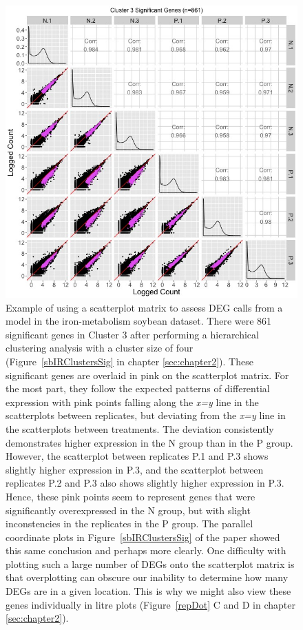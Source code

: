 \documentclass[11pt,a4paper,oldfontcommands,openany]{memoir}
\numberwithin{equation}{section} %
\begin{document}
\begin{figure}
\begin{framed}
\centerline{\includegraphics[width=\columnwidth]{MakeFigures/sbIRClusterSigSM3.jpg}}
\end{framed}
\caption{Example of using a scatterplot matrix to assess DEG calls from a model in the iron-metabolism soybean dataset. There were 861 significant genes in Cluster 3 after performing a hierarchical clustering analysis with a cluster size of four (Figure~\ref{sbIRClustersSig} in chapter \ref{sec:chapter2}). These significant genes are overlaid in pink on the scatterplot matrix. For the most part, they follow the expected patterns of differential expression with pink points falling along the \textit{x=y} line in the scatterplots between replicates, but deviating from the \textit{x=y} line in the scatterplots between treatments. The deviation consistently demonstrates higher expression in the N group than in the P group. However, the scatterplot between replicates P.1 and P.3 shows slightly higher expression in P.3, and the scatterplot between replicates P.2 and P.3 also shows slightly higher expression in P.3. Hence, these pink points seem to represent genes that were significantly overexpressed in the N group, but with slight inconstencies in the replicates in the P group. The parallel coordinate plots in Figure~\ref{sbIRClustersSig} of the paper showed this same conclusion and perhaps more clearly. One difficulty with plotting such a large number of DEGs onto the scatterplot matrix is that overplotting can obscure our inability to determine how many DEGs are in a given location. This is why we might also view these genes individually in litre plots (Figure~\ref{repDot} C and D in chapter \ref{sec:chapter2}).
\label{sbIRClusterSigSM3}}
\end{figure}  
\end{document}
